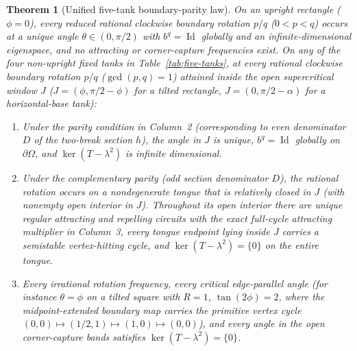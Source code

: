 \documentclass[11pt,reqno]{amsart}
\newtheorem{theorem}{Theorem}[section]
\theoremstyle{definition}
\theoremstyle{remark}
\DeclareMathOperator{\Id}{Id}
\begin{document}
\begin{theorem}[Unified five-tank boundary-parity law]\label{thm:five-tanks}
On an upright rectangle ($\phi = 0$), every reduced rational clockwise boundary rotation $p/q$ ($0 < p < q$) occurs at a unique angle $\theta \in (0,\pi/2)$ with $b^q = \Id$ globally and an infinite-dimensional eigenspace, and no attracting or corner-capture frequencies exist. On any of the four non-upright fixed tanks in Table~\ref{tab:five-tanks}, at every rational clockwise boundary rotation $p/q$ ($\gcd(p,q)=1$) attained inside the open supercritical window $J$ ($J = (\phi, \pi/2-\phi)$ for a tilted rectangle, $J = (0, \pi/2-\alpha)$ for a horizontal-base tank):
\begin{enumerate}
  \item Under the parity condition in Column~2 (corresponding to even denominator $D$ of the two-break section $h$), the angle in $J$ is unique, $b^q = \Id$ globally on $\partial\Omega$, and $\ker(T - \lambda^2)$ is infinite dimensional.
  \item Under the complementary parity (odd section denominator $D$), the rational rotation occurs on a nondegenerate tongue that is relatively closed in $J$ (with nonempty open interior in $J$). Throughout its open interior there are unique regular attracting and repelling circuits with the exact full-cycle attracting multiplier in Column~3, every tongue endpoint lying inside $J$ carries a semistable vertex-hitting cycle, and $\ker(T - \lambda^2) = \{0\}$ on the entire tongue.
  \item Every irrational rotation frequency, every critical edge-parallel angle (for instance $\theta = \phi$ on a tilted square with $R = 1$, $\tan(2\phi) = 2$, where the midpoint-extended boundary map carries the primitive vertex cycle $(0,0) \mapsto (1/2,1) \mapsto (1,0) \mapsto (0,0)$), and every angle in the open corner-capture bands satisfies $\ker(T - \lambda^2) = \{0\}$.
\end{enumerate}
\end{theorem}
\end{document}

